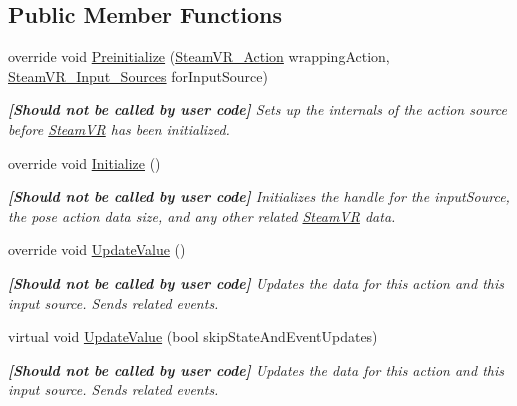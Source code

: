 \subsection*{Public Member Functions}
\begin{DoxyCompactItemize}
\item 
override void \mbox{\hyperlink{class_valve_1_1_v_r_1_1_steam_v_r___action___pose___source_a2e4aacdbfb9d1a2c5edffcd42e2c3c0e}{Preinitialize}} (\mbox{\hyperlink{class_valve_1_1_v_r_1_1_steam_v_r___action}{Steam\+V\+R\+\_\+\+Action}} wrapping\+Action, \mbox{\hyperlink{namespace_valve_1_1_v_r_a82e5bf501cc3aa155444ee3f0662853f}{Steam\+V\+R\+\_\+\+Input\+\_\+\+Sources}} for\+Input\+Source)
\begin{DoxyCompactList}\small\item\em {\bfseries{\mbox{[}Should not be called by user code\mbox{]}}} Sets up the internals of the action source before \mbox{\hyperlink{class_valve_1_1_v_r_1_1_steam_v_r}{Steam\+VR}} has been initialized. \end{DoxyCompactList}\item 
override void \mbox{\hyperlink{class_valve_1_1_v_r_1_1_steam_v_r___action___pose___source_ab25a681f8310683a3c6695973041acc0}{Initialize}} ()
\begin{DoxyCompactList}\small\item\em {\bfseries{\mbox{[}Should not be called by user code\mbox{]}}} Initializes the handle for the input\+Source, the pose action data size, and any other related \mbox{\hyperlink{class_valve_1_1_v_r_1_1_steam_v_r}{Steam\+VR}} data. \end{DoxyCompactList}\item 
override void \mbox{\hyperlink{class_valve_1_1_v_r_1_1_steam_v_r___action___pose___source_a2b299c57d8709519f9dfb91da28bde4e}{Update\+Value}} ()
\begin{DoxyCompactList}\small\item\em {\bfseries{\mbox{[}Should not be called by user code\mbox{]}}} Updates the data for this action and this input source. Sends related events. \end{DoxyCompactList}\item 
virtual void \mbox{\hyperlink{class_valve_1_1_v_r_1_1_steam_v_r___action___pose___source_a0254cddea71deac6f822536c4232a452}{Update\+Value}} (bool skip\+State\+And\+Event\+Updates)
\begin{DoxyCompactList}\small\item\em {\bfseries{\mbox{[}Should not be called by user code\mbox{]}}} Updates the data for this action and this input source. Sends related events. \end{DoxyCompactList}\item 

\end{DoxyCompactItemize}
